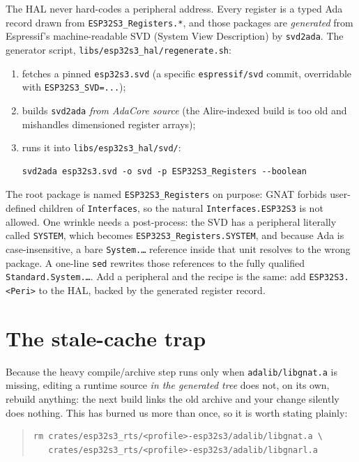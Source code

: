 The HAL never hard-codes a peripheral address. Every register is a typed Ada
record drawn from \texttt{ESP32S3\_Registers.*}, and those packages are
\emph{generated} from Espressif's machine-readable SVD (System View Description)
by \texttt{svd2ada}. The generator script,
\texttt{libs/esp32s3\_hal/regenerate.sh}:

\begin{enumerate}
\item fetches a pinned \texttt{esp32s3.svd} (a specific \texttt{espressif/svd}
  commit, overridable with \texttt{ESP32S3\_SVD=...});
\item builds \texttt{svd2ada} \emph{from AdaCore source} (the Alire-indexed
  build is too old and mishandles dimensioned register arrays);
\item runs it into \texttt{libs/esp32s3\_hal/svd/}:
\begin{lstlisting}[style=sh]
svd2ada esp32s3.svd -o svd -p ESP32S3_Registers --boolean
\end{lstlisting}
\end{enumerate}

The root package is named \texttt{ESP32S3\_Registers} on purpose: GNAT forbids
user-defined children of \texttt{Interfaces}, so the natural
\texttt{Interfaces.ESP32S3} is not allowed. One wrinkle needs a post-process:
the SVD has a peripheral literally called \texttt{SYSTEM}, which becomes
\texttt{ESP32S3\_Registers.SYSTEM}, and because Ada is case-insensitive, a
bare \texttt{System.\dots} reference inside that unit resolves to the wrong
package. A one-line \texttt{sed} rewrites those references to the fully qualified
\texttt{Standard.System.\dots}. Add a peripheral and the recipe is the same: add
\texttt{ESP32S3.<Peri>} to the HAL, backed by the generated register record.

\section{The stale-cache trap}
\label{sec:stale-cache}

Because the heavy compile/archive step runs only when
\texttt{adalib/libgnat.a} is missing, editing a runtime source \emph{in the
generated tree} does not, on its own, rebuild anything: the next build links
the old archive and your change silently does nothing. This has burned us more
than once, so it is worth stating plainly:

\begin{quote}
\begin{lstlisting}[style=sh]
rm crates/esp32s3_rts/<profile>-esp32s3/adalib/libgnat.a \
   crates/esp32s3_rts/<profile>-esp32s3/adalib/libgnarl.a
\end{lstlisting}
\end{quote}

